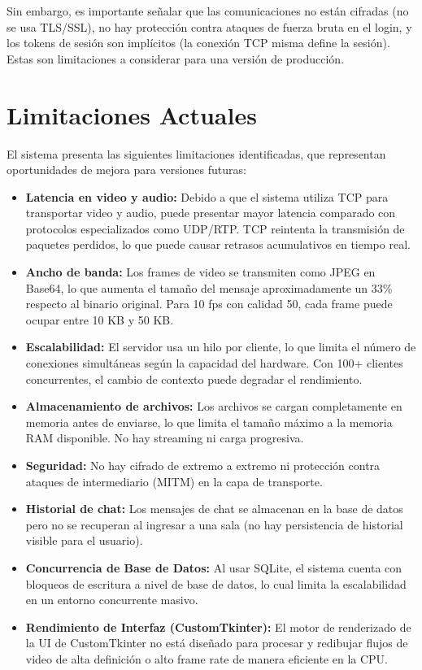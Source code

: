 \documentclass[12pt,a4paper]{article}
\begin{document}
Sin embargo, es importante se\~nalar que las comunicaciones no est\'an cifradas (no se usa TLS/SSL), no hay protecci\'on contra ataques de fuerza bruta en el login, y los tokens de sesi\'on son impl\'icitos (la conexi\'on TCP misma define la sesi\'on). Estas son limitaciones a considerar para una versi\'on de producci\'on.

\section{Limitaciones Actuales}

El sistema presenta las siguientes limitaciones identificadas, que representan oportunidades de mejora para versiones futuras:

\begin{itemize}
    \item \textbf{Latencia en video y audio:} Debido a que el sistema utiliza TCP para transportar video y audio, puede presentar mayor latencia comparado con protocolos especializados como UDP/RTP. TCP reintenta la transmisi\'on de paquetes perdidos, lo que puede causar retrasos acumulativos en tiempo real.
    \item \textbf{Ancho de banda:} Los frames de video se transmiten como JPEG en Base64, lo que aumenta el tamaño del mensaje aproximadamente un 33\% respecto al binario original. Para 10 fps con calidad 50, cada frame puede ocupar entre 10 KB y 50 KB.
    \item \textbf{Escalabilidad:} El servidor usa un hilo por cliente, lo que limita el n\'umero de conexiones simult\'aneas seg\'un la capacidad del hardware. Con 100+ clientes concurrentes, el cambio de contexto puede degradar el rendimiento.
    \item \textbf{Almacenamiento de archivos:} Los archivos se cargan completamente en memoria antes de enviarse, lo que limita el tama\~no m\'aximo a la memoria RAM disponible. No hay streaming ni carga progresiva.
    \item \textbf{Seguridad:} No hay cifrado de extremo a extremo ni protecci\'on contra ataques de intermediario (MITM) en la capa de transporte.
    \item \textbf{Historial de chat:} Los mensajes de chat se almacenan en la base de datos pero no se recuperan al ingresar a una sala (no hay persistencia de historial visible para el usuario).
    \item \textbf{Concurrencia de Base de Datos:} Al usar SQLite, el sistema cuenta con bloqueos de escritura a nivel de base de datos, lo cual limita la escalabilidad en un entorno concurrente masivo.
    \item \textbf{Rendimiento de Interfaz (CustomTkinter):} El motor de renderizado de la UI de CustomTkinter no est\'a dise\~nado para procesar y redibujar flujos de video de alta definici\'on o alto frame rate de manera eficiente en la CPU.
\end{itemize}
\end{document}
